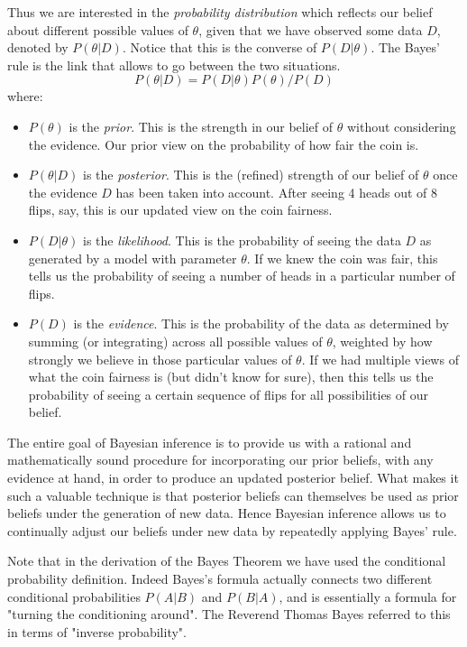 Thus we are interested in the \emph{probability distribution} which reflects our belief about different possible values of $\theta$, given that we have observed some data $D$, denoted by $P(\theta|D)$. Notice that this is the converse of $P(D|\theta)$. The Bayes' rule is the link that allows to go between the two situations.
\begin{equation}
  P(\theta|D) = P(D|\theta)P(\theta)/P(D)
\end{equation}
where:
\begin{itemize}
\item $P(\theta)$ is the \emph{prior}. This is the strength in our belief of $\theta$ without considering the evidence. Our prior view on the probability of how fair the coin is.
\item $P(\theta|D)$ is the \emph{posterior}. This is the (refined) strength of our belief of $\theta$ once the evidence $D$ has been taken into account. After seeing 4 heads out of 8 flips, say, this is our updated view on the coin fairness.
\item $P(D|\theta)$ is the \emph{likelihood}. This is the probability of seeing the data $D$ as generated by a model with parameter $\theta$. If we knew the coin was fair, this tells us the probability of seeing a number of heads in a particular number of flips.
\item $P(D)$ is the \emph{evidence}. This is the probability of the data as determined by summing (or integrating) across all possible values of $\theta$, weighted by how strongly we believe in those particular values of $\theta$. If we had multiple views of what the coin fairness is (but didn't know for sure), then this tells us the probability of seeing a certain sequence of flips for all possibilities of our belief.
\end{itemize}

The entire goal of Bayesian inference is to provide us with a rational and mathematically sound procedure for incorporating our prior beliefs, with any evidence at hand, in order to produce an updated posterior belief. What makes it such a valuable technique is that posterior beliefs can themselves be used as prior beliefs under the generation of new data. Hence Bayesian inference allows us to continually adjust our beliefs under new data by repeatedly applying Bayes' rule.

Note that in the derivation of the Bayes Theorem we have used the conditional probability definition. Indeed Bayes's formula actually connects two different conditional probabilities $P(A|B)$ and $P(B|A)$, and is essentially a formula for "turning the conditioning around". The Reverend Thomas Bayes referred to this in terms of "inverse probability".


